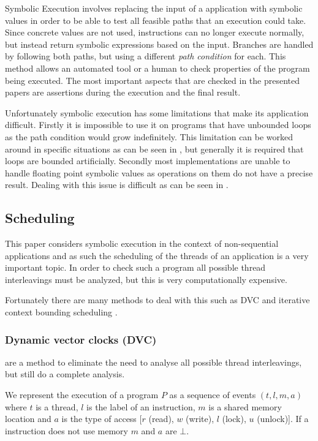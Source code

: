 \documentclass[10pt]{llncs}
\begin{document}
Symbolic Execution involves replacing the input of a application with symbolic values in order to be able to test all feasible paths that an execution could take. Since concrete values are not used, instructions can no longer execute normally, but instead return symbolic expressions based on the input. Branches are handled by following both paths, but using a different \emph{path condition} for each. This method allows an automated tool or a human to check properties of the program being executed. The most important aspects that are checked in the presented papers are assertions during the execution and the final result.

Unfortunately symbolic execution has some limitations that make its application difficult. Firstly it is impossible to use it on programs that have unbounded loops as the path condition would grow indefinitely. This limitation can be worked around in specific situations as can be seen in \cite{base5}, but generally it is required that loops are bounded artificially. Secondly most implementations are unable to handle floating point symbolic values as operations on them do not have a precise result. Dealing with this issue is difficult as can be seen in \cite{base1}.

\subsection{Scheduling}

This paper considers symbolic execution in the context of non-sequential applications and as such the scheduling of the threads of an application is a very important topic. In order to check such a program all possible thread interleavings must be analyzed, but this is very computationally expensive. 

Fortunately there are many methods to deal with this such as DVC \cite{dvc} and iterative context bounding scheduling \cite{musuvathi2007iterative}.

\subsubsection{Dynamic vector clocks (DVC)} are a method to eliminate the need to analyse all possible thread interleavings, but still do a complete analysis.

We represent the execution of a program $P$ as a sequence of events $(t, l, m, a)$ where $t$ is a thread, $l$ is the label of an instruction, $m$ is a shared memory location and $a$ is the type of access [$r$ (read), $w$ (write), $l$ (lock), $u$ (unlock)]. If a instruction does not use memory $m$ and $a$ are $\bot$.
\end{document}
